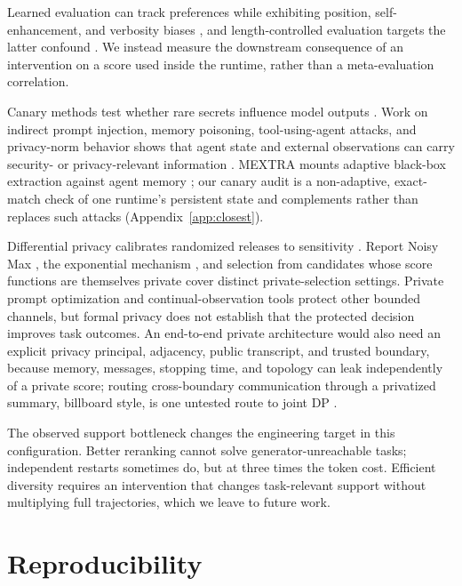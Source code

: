 \documentclass[11pt]{article}
\begin{document}
Learned evaluation can track preferences while exhibiting position, self-enhancement, and verbosity biases \citep{zheng2023judge}, and length-controlled evaluation targets the latter confound \citep{dubois2024length}. We instead measure the downstream consequence of an intervention on a score used inside the runtime, rather than a meta-evaluation correlation.

Canary methods test whether rare secrets influence model outputs \citep{carlini2019secret}. Work on indirect prompt injection, memory poisoning, tool-using-agent attacks, and privacy-norm behavior shows that agent state and external observations can carry security- or privacy-relevant information \citep{greshake2023indirect,chen2024agentpoison,debenedetti2024agentdojo,shao2024privacylens}. MEXTRA mounts adaptive black-box extraction against agent memory \citep{wang2025mextra}; our canary audit is a non-adaptive, exact-match check of one runtime's persistent state and complements rather than replaces such attacks (Appendix~\ref{app:closest}).

Differential privacy calibrates randomized releases to sensitivity \citep{dwork2006calibrating,dwork2014foundations}. Report Noisy Max \citep{dwork2014foundations}, the exponential mechanism \citep{mcsherry2007mechanism}, and selection from candidates whose score functions are themselves private \citep{liu2019private} cover distinct private-selection settings. Private prompt optimization \citep{hong2024dpopt} and continual-observation tools \citep{dwork2010continual} protect other bounded channels, but formal privacy does not establish that the protected decision improves task outcomes. An end-to-end private architecture would also need an explicit privacy principal, adjacency, public transcript, and trusted boundary, because memory, messages, stopping time, and topology can leak independently of a private score; routing cross-boundary communication through a privatized summary, billboard style, is one untested route to joint DP \citep{hsu2014private}.

The observed support bottleneck changes the engineering target in this configuration. Better reranking cannot solve generator-unreachable tasks; independent restarts sometimes do, but at three times the token cost. Efficient diversity requires an intervention that changes task-relevant support without multiplying full trajectories, which we leave to future work.

\section{Reproducibility}
\end{document}
